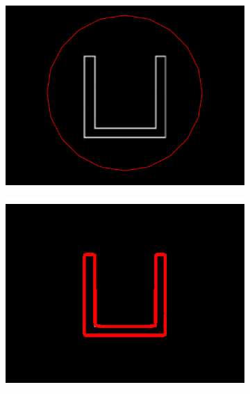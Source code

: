 \begin{appendices}
\begin{figure}[H]
\begin{subfigure}[c]{0.3\linewidth}
\centering
\includegraphics[width=\textwidth]{Chapters/Images/Conc/sq}
\caption{}
\end{subfigure}
\begin{subfigure}[c]{0.3\linewidth}
\centering
\includegraphics[width=\textwidth]{Chapters/Images/Conc/gvfsq}
\caption{}
\end{subfigure}
\begin{subfigure}[c]{0.3\linewidth}
\centering

\end{subfigure}
\end{figure}
\end{appendices}
